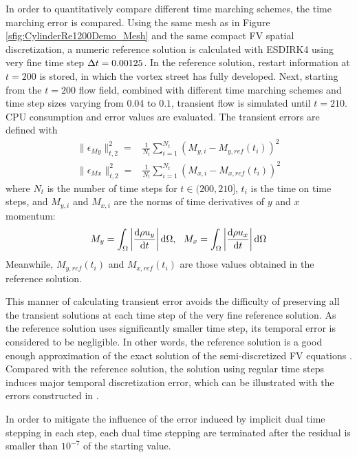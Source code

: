 \documentclass[preprint,12pt]{elsarticle}
\begin{document}
In order to quantitatively compare different
time marching schemes,
the time marching error is compared.
Using the same mesh as in Figure \ref{sfig:CylinderRe1200Demo_Mesh}
and the same compact FV spatial  discretization,
a numeric reference solution is calculated with ESDIRK4 using
very fine time step $\mathrm\Delta t = 0.00125$.
In the reference solution, restart information at $t=200$
is stored, in which the vortex street has fully developed.
Next, starting from the $t=200$ flow field, combined with
different time marching schemes and time step sizes
varying from $0.04$ to $0.1$, transient flow is simulated until $t=210$.
CPU consumption and error values are evaluated.
The transient errors are defined with
\begin{equation}
    \begin{aligned}
        \|\epsilon_{My}\|_{t,2}^2
        = & \frac{1}{N_{t}}\sum_{i=1}^{N_t}{(M_{y,i}-M_{y,ref}(t_i))^2} \\
        \|\epsilon_{Mx}\|_{t,2}^2
        = & \frac{1}{N_{t}}\sum_{i=1}^{N_t}{(M_{x,i}-M_{x,ref}(t_i))^2}
    \end{aligned}
    \label{eq:vorstreetErr}
\end{equation}
where $N_{t}$ is the number of time steps for $t\in(200,210]$,
$t_i$ is the time on time steps, and $M_{y,i}$ and $M_{x,i}$ are
the norms of time derivatives of $y$ and $x$ momentum:
\begin{equation}
    M_y = \int_{\Omega}{\left|\derivative{\rho u_y}{t}\right| \dd \Omega},\ \
    M_x = \int_{\Omega}{\left|\derivative{\rho u_x}{t}\right| \dd \Omega}
\end{equation}
Meanwhile, $M_{y,ref}(t_i)$ and $M_{x,ref}(t_i)$ are those values
obtained in the reference solution.

This manner of calculating transient error avoids the difficulty
of preserving all the transient solutions at each time step of
the very fine reference solution.
As the reference solution uses significantly smaller time step,
its temporal error is considered to be negligible.
In other words, the reference solution is a good enough
approximation of the exact solution of the semi-discretized
FV equations .
Compared with the reference
solution, the solution using regular time steps
induces major temporal discretization error, which can
be illustrated with the errors constructed in .

In order to mitigate the influence of the error induced
by implicit dual time stepping in each step,
each dual time stepping are terminated after
the residual is smaller than $10^{-7}$ of the
starting value.
\end{document}
